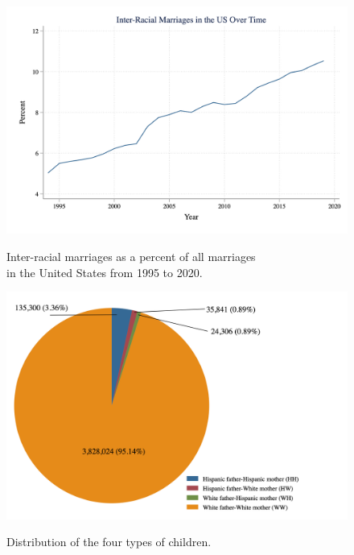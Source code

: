 \documentclass{wptemp}
\begin{document}
\begin{appendices}
\newpage

\begin{center}
\begin{figure}
\caption{Inter-racial marriages as a percent of all marriages \\
 in the United States from 1995 to 2020.}
\includegraphics[width=\textwidth]{interracialovertime.png} 
\label{fig:3}
\end{figure}
\end{center}

\newpage

\begin{center}
\begin{figure}
\caption{Distribution of the four types of children.}
\includegraphics[width=\textwidth]{PirChart2.png} 
\label{fig:dist}
\end{figure}
\end{center}


\end{appendices}
\end{document}
